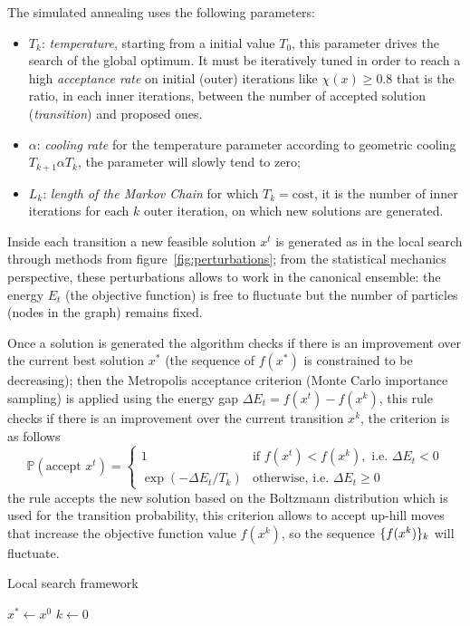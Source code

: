 The simulated annealing uses the following parameters:
\begin{itemize}
	\item $T_k$: \emph{temperature}, starting from a initial value $T_0$, this parameter drives the search of the global optimum. It must be iteratively tuned in order to reach a high \emph{acceptance rate} on initial (outer) iterations like $\chi(x)\geq0.8$ that is the ratio, in each inner iterations, between the number of accepted solution (\emph{transition}) and proposed ones.
	\item $\alpha$: \emph{cooling rate} for the temperature parameter according to geometric cooling $T_{k+1}\alpha T_k$, the parameter will slowly tend to zero;
	\item $L_k$: \emph{length of the Markov Chain} for which $T_k=\text{cost}$, it is the number of inner iterations for each $k$ outer iteration, on which new solutions are generated.
\end{itemize}

Inside each transition a new feasible solution $x^t$ is generated as in the local search through methods from figure~\vref{fig:perturbations}; from the statistical mechanics perspective, these perturbations allows to work in the canonical ensemble: the energy $E_t$ (the objective function) is free to fluctuate but the number of particles (nodes in the graph) remains fixed.

Once a solution is generated the algorithm checks if there is an improvement over the current best solution $x^\ast$ (the sequence of $f(x^\ast)$ is constrained to be decreasing); then the Metropolis acceptance criterion (Monte Carlo importance sampling) is applied using the energy gap $\Delta E_t=f(x^t)-f(x^k)$, this rule checks if there is an improvement over the current transition $x^k$, the criterion is as follows
\[
\mathbb{P}(\text{accept $x^t$})=
\begin{cases}
	1 & \text{if $f(x^t)<f(x^k), \text{ i.e. } \Delta E_t<0$} \\
	\exp(-\Delta E_t/T_k) & \text{otherwise, i.e. $\Delta E_t\geq0$}
\end{cases}
\]
the rule accepts the new solution based on the Boltzmann distribution which is used for the transition probability, this criterion allows to accept up-hill moves that increase the objective function value $f(x^k)$, so the sequence $\{f(x^k)\}_k$ will fluctuate.


\begin{algorithm}\caption{Local search framework}\label{alg:local-search}
$x^\ast\gets x^0$\;
$k\gets 0$\;
\end{algorithm}



